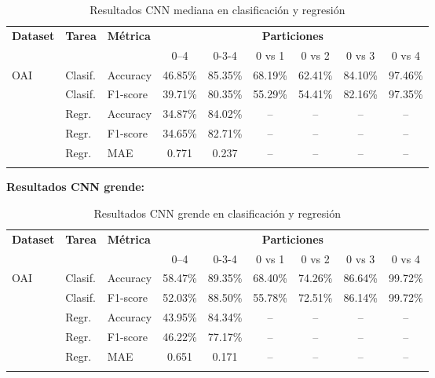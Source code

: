 \documentclass[11pt,spanish,listoffigures,listoftables]{tfgetsinf}
\begin{document}
\begin{table}[h]
    \centering
    \caption{Resultados CNN mediana en clasificación y regresión}
    \label{tab:cnn_mediana_results}
    \begin{tabular}{@{} l l l c c c c c c @{}} 
      \toprule
      \textbf{Dataset} & \textbf{Tarea} & \textbf{Métrica} 
        & \multicolumn{6}{c}{\textbf{Particiones}} \\
      \cmidrule(lr){4-9}
      & & & 0--4 & 0-3-4 & 0 vs 1 & 0 vs 2 & 0 vs 3 & 0 vs 4 \\
      \midrule
      \multirow{2}{*}{OAI}
        & Clasif. & Accuracy   & 46.85\% & 85.35\% & 68.19\% & 62.41\% & 84.10\% & 97.46\% \\
        & Clasif. & F1-score   & 39.71\% & 80.35\% & 55.29\% & 54.41\% & 82.16\% & 97.35\% \\
      \addlinespace
      \multirow{3}{*}{OAI}
        & Regr.   & Accuracy   & 34.87\% & 84.02\% & -- & -- & -- & -- \\
        & Regr.   & F1-score   & 34.65\% & 82.71\% & -- & -- & -- & -- \\
        & Regr.   & MAE        & 0.771 & 0.237 & -- & -- & -- & -- \\
      \addlinespace
    \end{tabular}
\end{table}

\textbf{Resultados CNN grende:}
 
\begin{table}[h]
    \centering
    \caption{Resultados CNN grende en clasificación y regresión}
    \label{tab:cnn_grande_results}
    \begin{tabular}{@{} l l l c c c c c c @{}} 
      \toprule
      \textbf{Dataset} & \textbf{Tarea} & \textbf{Métrica} 
        & \multicolumn{6}{c}{\textbf{Particiones}} \\
      \cmidrule(lr){4-9}
      & & & 0--4 & 0-3-4 & 0 vs 1 & 0 vs 2 & 0 vs 3 & 0 vs 4 \\
      \midrule
      \multirow{2}{*}{OAI}
        & Clasif. & Accuracy   & 58.47\% & 89.35\% & 68.40\% & 74.26\% & 86.64\% & 99.72\% \\
        & Clasif. & F1-score   & 52.03\% & 88.50\% & 55.78\% & 72.51\% & 86.14\% & 99.72\% \\
      \addlinespace
      \multirow{3}{*}{OAI}
        & Regr.   & Accuracy   & 43.95\% & 84.34\% & -- & -- & -- & -- \\
        & Regr.   & F1-score   & 46.22\% & 77.17\% & -- & -- & -- & -- \\
        & Regr.   & MAE        & 0.651 & 0.171 & -- & -- & -- & -- \\
      \addlinespace
    \end{tabular}
\end{table}
\end{document}
